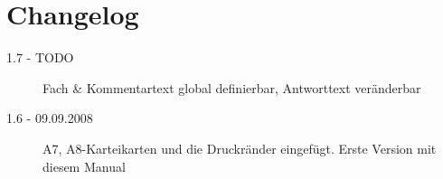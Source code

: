 \documentclass[a4paper]{article}
\begin{document}
\section{Changelog}
\begin{description}
	\item[1.7 - TODO] Fach \& Kommentartext global definierbar, Antworttext veränderbar
	\item[1.6 - 09.09.2008] A7, A8-Karteikarten und die Druckränder eingefügt. Erste Version mit diesem Manual
\end{description}
\end{document}
